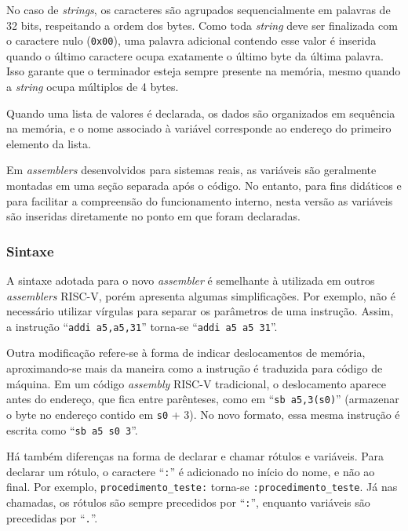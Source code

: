 \documentclass[
	12pt,				%
	openright,			%
	oneside,			%
	a4paper,			%
	english,			%
	french,				%
	spanish,			%
	brazil,				%
	]{abntex2}
\begin{document}
No caso de \textit{strings}, os caracteres são agrupados sequencialmente em palavras de 32 bits, respeitando a ordem dos bytes. Como toda \textit{string} deve ser finalizada com o caractere nulo (\texttt{0x00}), uma palavra adicional contendo esse valor é inserida quando o último caractere ocupa exatamente o último byte da última palavra. Isso garante que o terminador esteja sempre presente na memória, mesmo quando a \textit{string} ocupa múltiplos de 4 bytes.

Quando uma lista de valores é declarada, os dados são organizados em sequência na memória, e o nome associado à variável corresponde ao endereço do primeiro elemento da lista.

Em \textit{assemblers} desenvolvidos para sistemas reais, as variáveis são geralmente montadas em uma seção separada após o código. No entanto, para fins didáticos e para facilitar a compreensão do funcionamento interno, nesta versão as variáveis são inseridas diretamente no ponto em que foram declaradas.

\subsubsection{Sintaxe}

A sintaxe adotada para o novo \textit{assembler} é semelhante à utilizada em outros \textit{assemblers} RISC-V, porém apresenta algumas simplificações. Por exemplo, não é necessário utilizar vírgulas para separar os parâmetros de uma instrução. Assim, a instrução ``\texttt{addi~a5,a5,31}'' torna-se ``\texttt{addi~a5~a5~31}''.

Outra modificação refere-se à forma de indicar deslocamentos de memória, \\aproximando-se mais da maneira como a instrução é traduzida para código de máquina. Em um código \textit{assembly} RISC-V tradicional, o deslocamento aparece antes do endereço, que fica entre parênteses, como em ``\texttt{sb~a5,3(s0)}'' (armazenar o byte no endereço contido em \texttt{s0} + 3). No novo formato, essa mesma instrução é escrita como ``\texttt{sb~a5~s0~3}''.

Há também diferenças na forma de declarar e chamar rótulos e variáveis. Para declarar um rótulo, o caractere ``\texttt{:}'' é adicionado no início do nome, e não ao final. Por exemplo, \texttt{procedimento\_teste:} torna-se \texttt{:procedimento\_teste}. Já nas chamadas, os rótulos são sempre precedidos por ``\texttt{:}'', enquanto variáveis são precedidas por ``\texttt{.}''.
\end{document}
